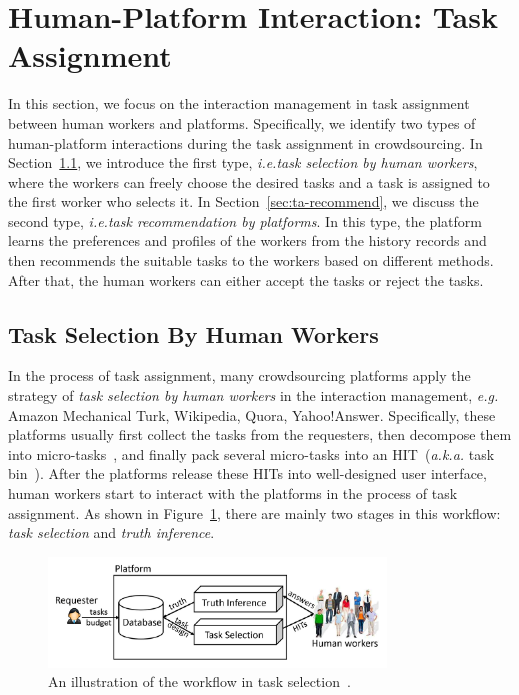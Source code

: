 \documentclass[11pt]{article}
\newcommand{\eg}{\textit{e.g.}\xspace}
\newcommand{\ie}{\textit{i.e.}\xspace}
\newcommand{\aka}{\textit{a.k.a.}\xspace}
\newcommand\figref[1]{Figure~\ref{#1}}
\newcommand\secref[1]{Section~\ref{#1}}
\begin{document}
\section{Human-Platform Interaction: Task Assignment} %
In this section, we focus on the interaction management in task assignment between human workers and platforms.
Specifically, we identify two types of human-platform interactions during the task assignment in crowdsourcing.
In \secref{sec:ta-selection}, we introduce the first type, \ie \textit{task selection by human workers},
where the workers can freely choose the desired tasks 
and a task is assigned to the first worker who selects it.
In \secref{sec:ta-recommend}, we discuss the second type,
\ie \textit{task recommendation by platforms}.
In this type, the platform learns the preferences and profiles of the workers from the history records
and then recommends the suitable tasks to the workers based on different methods.
After that, the human workers can either accept the tasks or reject the tasks.

\subsection{Task Selection By Human Workers}\label{sec:ta-selection}

In the process of task assignment,
many crowdsourcing platforms apply the strategy of \textit{task selection by human workers} in the interaction management,
\eg Amazon Mechanical Turk, Wikipedia, Quora, Yahoo!Answer.
Specifically, these platforms usually first collect the tasks from the requesters,
then decompose them into micro-tasks~\cite{DBLP:journals/tkde/TongCZJSL18},
and finally pack several micro-tasks into an HIT~(\aka task bin~\cite{DBLP:journals/tkde/TongCZJSL18}).
After the platforms release these HITs into well-designed user interface,
human workers start to interact with the platforms in the process of task assignment.
As shown in \figref{fig:ts-flow}, there are mainly two stages in this workflow: \textit{task selection} and \textit{truth inference}.

\begin{figure}
	\centering
	\includegraphics[width=0.8\textwidth]{submissions/yongxin/figs/task-select.pdf}
	\caption{An illustration of the workflow in task selection~\cite{DBLP:journals/tkde/LiWZF16}.}
	\label{fig:ts-flow}
\end{figure}
\end{document}
